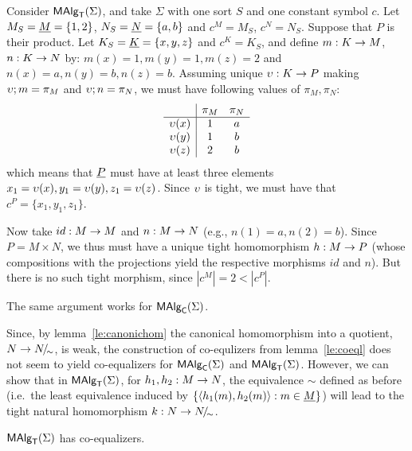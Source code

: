 \documentclass[10pt]{article}
\begin{document}
\begin{Proof}
Consider $\mbox{\rm\sf MAlg}_{\sf T}(\Sigma)$, and take $\Sigma$ with one sort $S$ and one constant
symbol $c$.  Let $M_S=\underline {M}=\{1,2\}$, $N_S=\underline {N}=\{a,b\}$ and
$c^{M}=M_S$, $c^{N}=N_S$.  Suppose that $P$ is their product. Let
$K_S=\underline {K}=\{x,y,z\}$ and $c^K=K_S$, and define $m:K\rightarrow M$,
$n:K\rightarrow N$ by: $m(x)=1, m(y)=1, m(z)=2$ and $n(x)=a, n(y)=b,
n(z)=b$. Assuming unique $\upsilon:K\rightarrow P$ making $\upsilon;m=\pi_M$
and $\upsilon;n=\pi_N$, we must have following values of $\pi_M,
\pi_N:$ {\small { \[ \begin{array}{c|cc} & \pi_M & \pi_N \\ \hline
\upsilon(x) & 1 & a \\ \upsilon(y) & 1 & b \\ \upsilon(z) & 2 & b \end{array} \] }
} which means that $\underline {P}$ must have at least three elements
$x_1=\upsilon(x), y_1=\upsilon(y), z_1=\upsilon(z)$.  Since $\upsilon$ is tight, we
must have that $c^P=\{x_1,y_1,z_1\}$.

Now take $id:M\rightarrow M$ and $n:M\rightarrow N$ (e.g., $n(1)=a,
n(2)=b$). Since $P=M\times N$, we thus must have a unique tight
homomorphism $h:M\rightarrow P$ (whose compositions with the projections
yield the respective morphisms $id$ and $n$). But there is no such
tight morphism, since $|c^M|=2 < |c^P|$.

The same argument works for $\mbox{\rm\sf MAlg}_{\sf C}(\Sigma)$.
\end{Proof}

\noindent
Since, by lemma~\ref{le:canonichom} the canonical homomorphism into a
quotient, $N\rightarrow N\!{\textstyle /}\!_{\sim}$, is weak, the construction of
co-equlizers from lemma~\ref{le:coeql} does not seem to yield
co-equalizers for $\mbox{\rm\sf MAlg}_{\sf C}(\Sigma)$ and $\mbox{\rm\sf MAlg}_{\sf T}(\Sigma)$.  However, we can show that in
$\mbox{\rm\sf MAlg}_{\sf T}(\Sigma)$, for $h_1,h_2:M\rightarrow N$, the equivalence $\sim$ defined as
before (i.e.\ the least equivalence induced by
$\{\langle h_1(m),h_2(m)\rangle:m\in\underline {M}\}$) will lead to the tight
natural homomorphism $k:N\rightarrow N\!{\textstyle /}\!_{\sim}$.

\begin{Fact}
$\mbox{\rm\sf MAlg}_{\sf T}(\Sigma)$ has co-equalizers.
\end{Fact}
\end{document}
